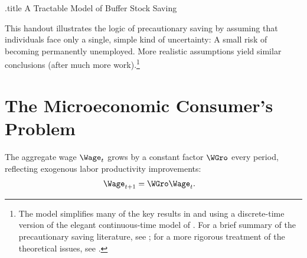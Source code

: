 \documentclass{handout}
\begin{document}
\handoutHeader
\providecommand{\dmEqZero}{\ensuremath{\Delta\mRatE=0}}
\providecommand{\dcEqZero}{\ensuremath{\Delta\cRatE=0}}

\begin{verbatimwrite}{\jobname.title}
A Tractable Model of Buffer Stock Saving
\end{verbatimwrite}

\handoutNameMake


This handout illustrates the logic of precautionary saving by assuming
that individuals face only a single, simple kind of uncertainty: A small risk of becoming permanently unemployed.  More realistic assumptions yield similar conclusions (after much more work).\footnote{The model simplifies many of the key results in \cite{carroll:brookings} and \cite{carrollBSLCPIH} using a  discrete-time version of the elegant continuous-time model of \cite{toche:urisk}.
  For a brief summary of the precautionary saving literature, see
  \cite{CarrollKimballPSPW}; for a more rigorous   treatment of the theoretical issues, see \cite{BufferStockTheory}.}

\section{The Microeconomic Consumer's Problem}
The aggregate wage $\Wage_{t}$ grows
by a constant factor $\WGro$ every period, reflecting exogenous labor productivity improvements:
\begin{equation}\begin{gathered}\begin{aligned}
        \Wage_{t+1} & =  \WGro \Wage_{t}.
\end{aligned}\end{gathered}\end{equation}
\end{document}
